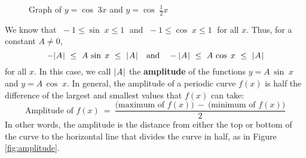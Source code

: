 \begin{exmp}
\begin{figure}[h]
\begin{center}
\vspace{-6mm}
 \end{center}
 \caption[]{\quad Graph of $y=\cos\;3x$ and $y=\cos\;\frac{1}{2}x$}
 \label{fig:cosine3x}
\end{figure}
\end{exmp}
\divider
\vspace{1mm}

We know that $\;-1 \le \sin\;x \le 1\;$ and $\;-1 \le \cos\;x \le 1\;$ for all $x$. Thus, for a
constant $A \ne 0$,
\begin{displaymath}
 -\lvert\mspace{1mu}A\mspace{1mu}\rvert ~\le~ A\,\sin\;x ~\le~ \lvert\mspace{1mu}A\mspace{1mu}\rvert \quad\text{and}\quad
 -\lvert\mspace{1mu}A\mspace{1mu}\rvert ~\le~ A\,\cos\;x ~\le~ \lvert\mspace{1mu}A\mspace{1mu}\rvert
\end{displaymath}
for all $x$. In this case, we call $\lvert\mspace{1mu}A\mspace{1mu}\rvert$ the \textbf{amplitude} of the
functions $y=A\,\sin\;x$ and $y=A\,\cos\;x$. In general, the amplitude of a periodic curve $f(x)$
is half the difference of the largest and smallest values that $f(x)$ can take:
\begin{displaymath}
 \text{Amplitude of $f(x)$} ~=~ \frac{\text{(maximum of $f(x)$)} ~-~ \text{(minimum of $f(x)$)}}{2}
\end{displaymath}
In other words, the amplitude is the distance from either the top or bottom of the curve to the
horizontal line that divides the curve in half, as in Figure \ref{fig:amplitude}.

